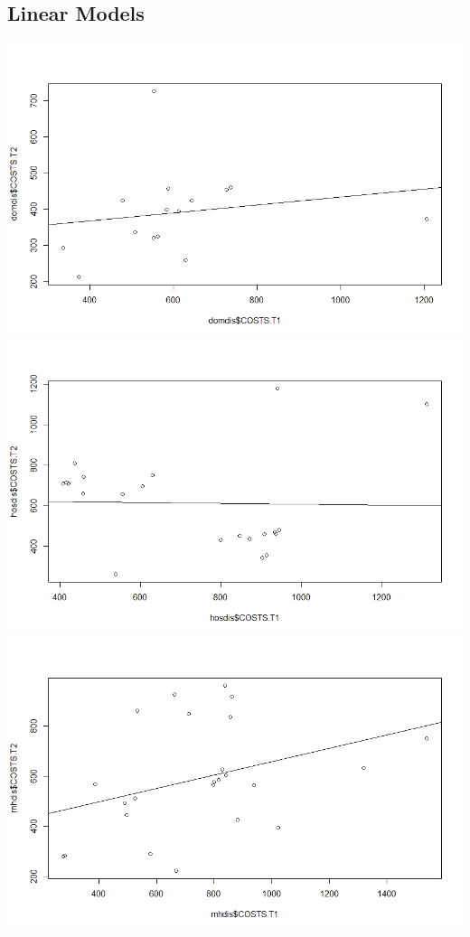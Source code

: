 \documentclass[11pt]{article}
\begin{document}
\subsection{Linear Models}
\includegraphics[width=15cm]{RStudio/jpeg/Reg DOM.jpeg}
\includegraphics[width=15cm]{RStudio/jpeg/Reg HOS.jpeg}
\includegraphics[width=15cm]{RStudio/jpeg/Reg RNH.jpeg}
\end{document}

